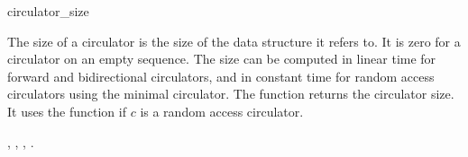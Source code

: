 
\begin{ccRefFunction}{circulator_size}

\ccDefinition


The size of a circulator is the size of the data structure it refers
to. It is zero for a circulator on an empty sequence. The size can be
computed in linear time for forward and bidirectional circulators, and
in constant time for random access circulators using the minimal
circulator. The function 
returns the circulator size. It uses the
 function if $c$ is a random
access circulator.



\ccSeeAlso

,
,
,
.

\end{ccRefFunction}

